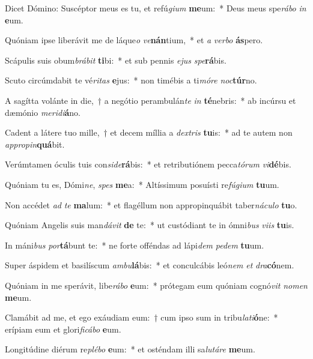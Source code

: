 \item Dicet Dómino: Suscéptor meus es tu, et refú\textit{gi}\textit{um} \textbf{me}um:~* Deus meus spe\textit{rá}\textit{bo} \textit{in} \textbf{e}um.
\item Quóniam ipse liberávit me de láque\textit{o} \textit{ve}\textbf{nán}tium,~* et \textit{a} \textit{ver}\textit{bo} \textbf{ás}pero.
\item Scápulis suis obum\textit{brá}\textit{bit} \textbf{ti}bi:~* et sub pennis \textit{e}\textit{jus} \textit{spe}\textbf{rá}bis.
\item Scuto circúmdabit te vé\textit{ri}\textit{tas} \textbf{e}jus:~* non timébis a ti\textit{mó}\textit{re} \textit{noc}\textbf{túr}no.
\item A sagítta volánte in die,~† a negótio perambulán\textit{te} \textit{in} \textbf{té}nebris:~* ab incúrsu et dæmónio \textit{me}\textit{ri}\textit{di}\textbf{á}no.
\item Cadent a látere tuo mille,~† et decem míllia a \textit{dex}\textit{tris} \textbf{tu}is:~* ad te autem non \textit{ap}\textit{pro}\textit{pin}\textbf{quá}bit.
\item Verúmtamen óculis tuis con\textit{si}\textit{de}\textbf{rá}bis:~* et retributiónem pecca\textit{tó}\textit{rum} \textit{vi}\textbf{dé}bis.
\item Quóniam tu es, Dómi\textit{ne}, \textit{spes} \textbf{me}a:~* Altíssimum posuísti re\textit{fú}\textit{gi}\textit{um} \textbf{tu}um.
\item Non accédet \textit{ad} \textit{te} \textbf{ma}lum:~* et flagéllum non appropinquábit taber\textit{ná}\textit{cu}\textit{lo} \textbf{tu}o.
\item Quóniam Angelis suis man\textit{dá}\textit{vit} \textbf{de} te:~* ut custódiant te in ómni\textit{bus} \textit{vi}\textit{is} \textbf{tu}is.
\item In máni\textit{bus} \textit{por}\textbf{tá}bunt te:~* ne forte offéndas ad lápi\textit{dem} \textit{pe}\textit{dem} \textbf{tu}um.
\item Super áspidem et basilíscum \textit{am}\textit{bu}\textbf{lá}bis:~* et conculcábis leó\textit{nem} \textit{et} \textit{dra}\textbf{có}nem.
\item Quóniam in me sperávit, libe\textit{rá}\textit{bo} \textbf{e}um:~* prótegam eum quóniam cognó\textit{vit} \textit{no}\textit{men} \textbf{me}um.
\item Clamábit ad me, et ego exáudiam eum:~† cum ipso sum in tribu\textit{la}\textit{ti}\textbf{ó}ne:~* erípiam eum et glori\textit{fi}\textit{cá}\textit{bo} \textbf{e}um.
\item Longitúdine diérum re\textit{plé}\textit{bo} \textbf{e}um:~* et osténdam illi sa\textit{lu}\textit{tá}\textit{re} \textbf{me}um.
